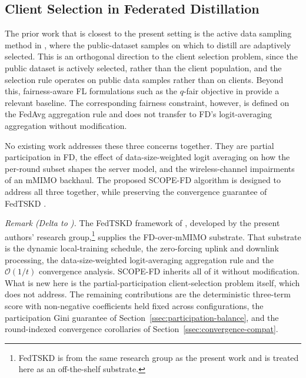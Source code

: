 \documentclass[journal]{IEEEtran}
\newcommand{\rev}[1]{#1}
\begin{document}
\subsection{Client Selection in Federated Distillation}
\label{ssec:rw-fd-selection}

The prior work that is closest to the present setting is the active data sampling method in \cite{liu2022active}, where the public-dataset samples on which to distill are adaptively selected. This is an orthogonal direction to the client selection problem, since the public dataset is actively selected, rather than the client population, and the selection rule operates on public data samples rather than on clients. Beyond this, fairness-aware FL formulations such as the $q$-fair objective in \cite{li2020qffl} provide a relevant baseline. The corresponding fairness constraint, however, is defined on the FedAvg aggregation rule and does not transfer to FD's logit-averaging aggregation without modification.

No existing work addresses these three concerns together. They are partial participation in FD, the effect of data-size-weighted logit averaging on how the per-round subset shapes the server model, and the wireless-channel impairments of an mMIMO backhaul. The proposed SCOPE-FD algorithm is designed to address all three together, while preserving the convergence guarantee of FedTSKD \cite{mu2024fedtskd}.

\textit{Remark (Delta to \cite{mu2024fedtskd}).} The FedTSKD framework of \cite{mu2024fedtskd}, developed by the present authors' research group,\footnote{FedTSKD \cite{mu2024fedtskd} is from the same research group as the present work and is treated here as an off-the-shelf substrate.} supplies the FD-over-mMIMO substrate. That substrate is the dynamic local-training schedule, the zero-forcing uplink and downlink processing, the data-size-weighted logit-averaging aggregation rule and the $\mathcal{O}(1/t)$ convergence analysis. SCOPE-FD inherits all of it without modification. What is new here is the partial-participation client-selection problem itself, which \cite{mu2024fedtskd} does not address. The remaining contributions are the deterministic three-term score with non-negative coefficients held fixed across configurations, the participation Gini guarantee of Section~\ref{ssec:participation-balance}, and \rev{the round-indexed convergence corollaries of Section~\ref{ssec:convergence-compat}.}

\end{document}
